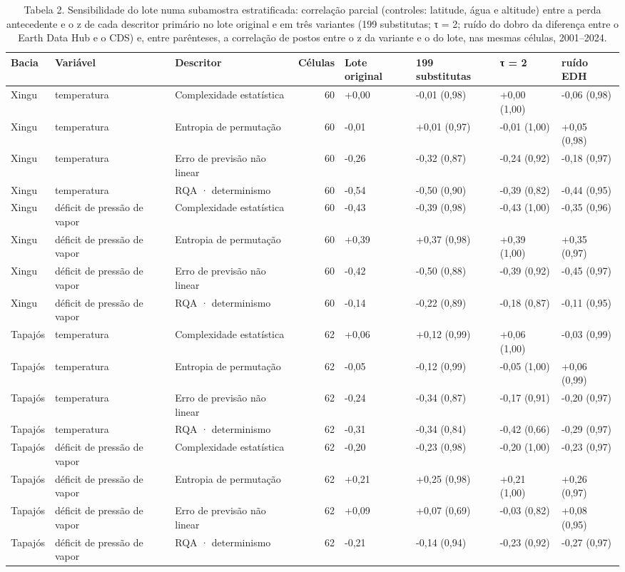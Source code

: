 \begin{table}
\caption{Tabela 2. Sensibilidade do lote numa subamostra estratificada: correlação parcial (controles: latitude, água e altitude) entre a perda antecedente e o z de cada descritor primário no lote original e em três variantes (199 substitutas; τ = 2; ruído do dobro da diferença entre o Earth Data Hub e o CDS) e, entre parênteses, a correlação de postos entre o z da variante e o do lote, nas mesmas células, 2001–2024.}
\label{tab:07_descritores::sensibilidade_lote}
\begin{tabular}{lllrllll}
\toprule
Bacia & Variável & Descritor & Células & Lote original & 199 substitutas & τ = 2 & ruído EDH \\
\midrule
Xingu & temperatura & Complexidade estatística & 60 & +0,00 & -0,01 (0,98) & +0,00 (1,00) & -0,06 (0,98) \\
Xingu & temperatura & Entropia de permutação & 60 & -0,01 & +0,01 (0,97) & -0,01 (1,00) & +0,05 (0,98) \\
Xingu & temperatura & Erro de previsão não linear & 60 & -0,26 & -0,32 (0,87) & -0,24 (0,92) & -0,18 (0,97) \\
Xingu & temperatura & RQA · determinismo & 60 & -0,54 & -0,50 (0,90) & -0,39 (0,82) & -0,44 (0,95) \\
Xingu & déficit de pressão de vapor & Complexidade estatística & 60 & -0,43 & -0,39 (0,98) & -0,43 (1,00) & -0,35 (0,96) \\
Xingu & déficit de pressão de vapor & Entropia de permutação & 60 & +0,39 & +0,37 (0,98) & +0,39 (1,00) & +0,35 (0,97) \\
Xingu & déficit de pressão de vapor & Erro de previsão não linear & 60 & -0,42 & -0,50 (0,88) & -0,39 (0,92) & -0,45 (0,97) \\
Xingu & déficit de pressão de vapor & RQA · determinismo & 60 & -0,14 & -0,22 (0,89) & -0,18 (0,87) & -0,11 (0,95) \\
Tapajós & temperatura & Complexidade estatística & 62 & +0,06 & +0,12 (0,99) & +0,06 (1,00) & -0,03 (0,99) \\
Tapajós & temperatura & Entropia de permutação & 62 & -0,05 & -0,12 (0,99) & -0,05 (1,00) & +0,06 (0,99) \\
Tapajós & temperatura & Erro de previsão não linear & 62 & -0,24 & -0,34 (0,87) & -0,17 (0,91) & -0,20 (0,97) \\
Tapajós & temperatura & RQA · determinismo & 62 & -0,31 & -0,34 (0,84) & -0,42 (0,66) & -0,29 (0,97) \\
Tapajós & déficit de pressão de vapor & Complexidade estatística & 62 & -0,20 & -0,23 (0,98) & -0,20 (1,00) & -0,23 (0,97) \\
Tapajós & déficit de pressão de vapor & Entropia de permutação & 62 & +0,21 & +0,25 (0,98) & +0,21 (1,00) & +0,26 (0,97) \\
Tapajós & déficit de pressão de vapor & Erro de previsão não linear & 62 & +0,09 & +0,07 (0,69) & -0,03 (0,82) & +0,08 (0,95) \\
Tapajós & déficit de pressão de vapor & RQA · determinismo & 62 & -0,21 & -0,14 (0,94) & -0,23 (0,92) & -0,27 (0,97) \\
\bottomrule
\end{tabular}
\end{table}
